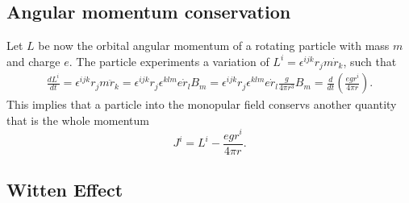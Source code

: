 \documentclass[main.tex]{subfiles}
\begin{document}
\subsection{Angular momentum conservation}
Let $L$ be now the orbital angular momentum of a rotating particle with mass $m$ and charge $e$. The particle experiments a variation of $L^i=\epsilon^{ijk}r_jm\dot r_k$, such that
\begin{align}
\frac{dL^i}{dt}=\epsilon^{ijk}r_jm\ddot r_k=\epsilon^{ijk}r_j\epsilon^{klm}e\dot r_lB_m=\epsilon^{ijk}r_j\epsilon^{klm}e\dot r_l\frac{g}{4\pi r^3}B_m=\frac{d}{dt}\left(\frac{egr^i}{4\pi r}\right).
\end{align}
This implies that a particle into the monopular field conservs another quantity that is the whole momentum
\begin{equation}
J^i=L^i-\frac{egr^i}{4\pi r}.
\end{equation}
\subsection{Witten Effect}
\end{document}
